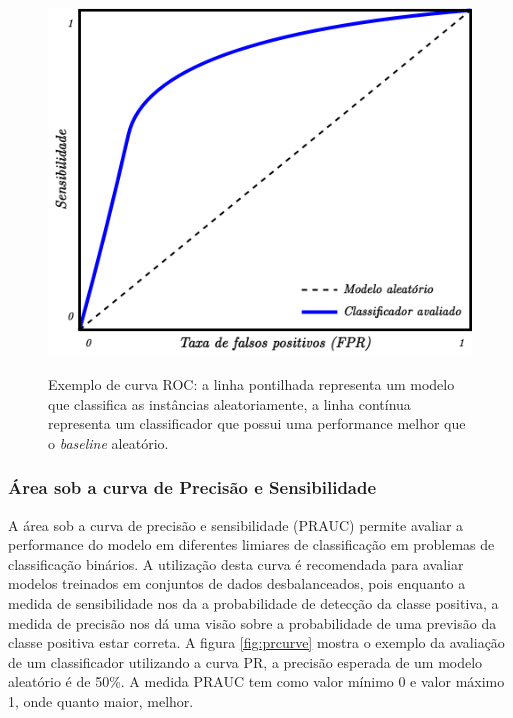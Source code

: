 \begin{figure}[htbp]
	\centering
	\caption{Exemplo de curva ROC: a linha pontilhada representa um modelo que classifica as instâncias aleatoriamente, a linha contínua representa um classificador que possui uma performance melhor que o \textit{baseline} aleatório.}
		\includegraphics[scale=.25]{imagens/auroc.png}
	\label{fig:aucroc}
\end{figure}

\subsubsection{Área sob a curva de Precisão e Sensibilidade}

A área sob a curva de precisão e sensibilidade (PRAUC) permite avaliar a performance do modelo em diferentes limiares de classificação em problemas de classificação binários.
A utilização desta curva é recomendada para avaliar modelos treinados em conjuntos de dados desbalanceados, pois enquanto a medida de sensibilidade nos da a probabilidade de detecção da classe positiva, a medida de precisão nos dá uma visão sobre a probabilidade de uma previsão da classe positiva estar correta. A figura \ref{fig:prcurve} mostra o exemplo da avaliação de um classificador utilizando a curva PR, a precisão esperada de um modelo aleatório é de 50\%. A medida PRAUC tem como valor mínimo 0 e valor máximo 1, onde quanto maior, melhor.

